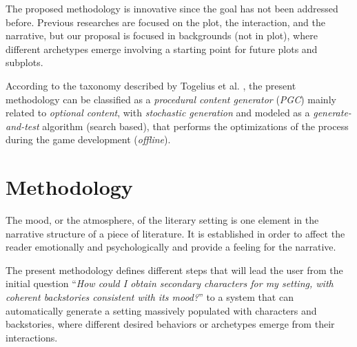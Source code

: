 \documentclass[letterpaper]{article}
\begin{document}
The proposed methodology is innovative since the goal has not been addressed before. Previous researches are focused on the plot, the interaction, and the narrative, but our proposal is focused in backgrounds (not in plot), where different archetypes emerge involving a starting point for future plots and subplots.


According to the taxonomy described by Togelius et al. \cite{Togelius2011}, the present methodology can be classified as a \textit{procedural content generator} (\textit{PGC})
mainly related to \textit{optional content}, with \textit{stochastic generation}
and modeled as a \textit{generate-and-test} algorithm (search based), that
performs the optimizations of the process during the game development (\textit{offline}).






%
%

\section{Methodology}
\label{sec:methodology}

The mood, or the atmosphere, of the literary setting is one element in the narrative structure of a piece of literature. It is established in order to affect the reader emotionally and psychologically and provide a feeling for the narrative.


The present methodology defines different steps that will lead the user from the initial question ``\textit{How could I obtain secondary characters for my setting, with coherent backstories consistent with its mood?}'' to a system that can automatically generate a setting massively populated with characters and backstories, where different desired behaviors or archetypes emerge from their interactions.
\end{document}
